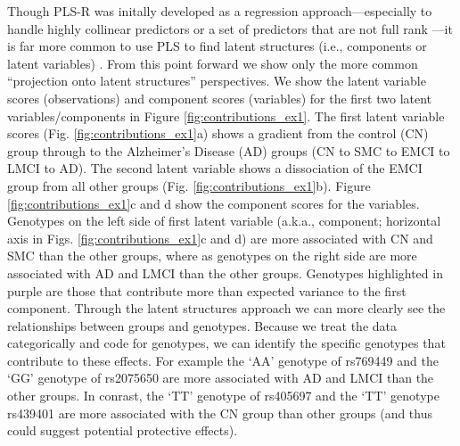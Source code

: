 \documentclass[12pt]{article}
\begin{document}
Though PLS-R was initally developed as a regression
approach---especially to handle highly collinear predictors or a set of
predictors that are not full rank \citep[see explanations
in][]{wold_collinearity_1984}---it is far more common to use PLS to find
latent structures (i.e., components or latent variables)
\citep{abdi_partial_2010-1}. From this point forward we show only the
more common ``projection onto latent structures'' perspectives. We show
the latent variable scores (observations) and component scores
(variables) for the first two latent variables/components in Figure
\ref{fig:contributions_ex1}. The first latent variable scores (Fig.
\ref{fig:contributions_ex1}a) shows a gradient from the control (CN)
group through to the Alzheimer's Disease (AD) groups (CN to SMC to EMCI
to LMCI to AD). The second latent variable shows a dissociation of the
EMCI group from all other groups (Fig. \ref{fig:contributions_ex1}b).
Figure \ref{fig:contributions_ex1}c and d show the component scores for
the variables. Genotypes on the left side of first latent variable
(a.k.a., component; horizontal axis in Figs.
\ref{fig:contributions_ex1}c and d) are more associated with CN and SMC
than the other groups, where as genotypes on the right side are more
associated with AD and LMCI than the other groups. Genotypes highlighted
in purple are those that contribute more than expected variance to the
first component. Through the latent structures approach we can more
clearly see the relationships between groups and genotypes. Because we
treat the data categorically and code for genotypes, we can identify the
specific genotypes that contribute to these effects. For example the
`AA' genotype of rs769449 and the `GG' genotype of rs2075650 are more
associated with AD and LMCI than the other groups. In conrast, the `TT'
genotype of rs405697 and the `TT' genotype rs439401 are more associated
with the CN group than other groups (and thus could suggest potential
protective effects).
\end{document}
